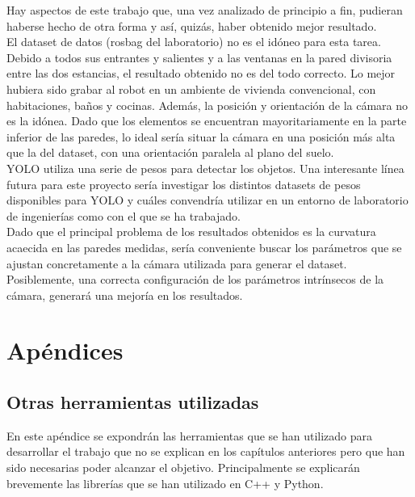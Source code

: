 Hay aspectos de este trabajo que, una vez analizado de principio a fin, pudieran haberse hecho de otra forma y así, quizás, haber obtenido mejor resultado.\\

El dataset de datos (rosbag del laboratorio) no es el idóneo para esta tarea. Debido a todos sus entrantes y salientes y a las ventanas en la pared divisoria entre las dos estancias, el resultado obtenido no es del todo correcto. Lo mejor hubiera sido grabar al robot en un ambiente de vivienda convencional, con habitaciones, baños y cocinas. Además, la posición y orientación de la cámara no es la idónea. Dado que los elementos se encuentran mayoritariamente en la parte inferior de las paredes, lo ideal sería situar la cámara en una posición más alta que la del dataset, con una orientación paralela al plano del suelo.\\

YOLO utiliza una serie de pesos para detectar los objetos. Una interesante línea futura para este proyecto sería investigar los distintos datasets de pesos disponibles para YOLO y cuáles convendría utilizar en un entorno de laboratorio de ingenierías como con el que se ha trabajado.\\

Dado que el principal problema de los resultados obtenidos es la curvatura acaecida en las paredes medidas, sería conveniente buscar los parámetros que se ajustan concretamente a la cámara utilizada para generar el dataset. Posiblemente, una correcta configuración de los parámetros intrínsecos de la cámara, generará una mejoría en los resultados.\\


\part{Apéndices}

\appendix

\chapter{Otras herramientas utilizadas}

En este apéndice se expondrán las herramientas que se han utilizado para desarrollar el trabajo que no se explican en los capítulos anteriores pero que han sido necesarias poder alcanzar el objetivo. Principalmente se explicarán brevemente las librerías que se han utilizado en C++ y Python.\\

